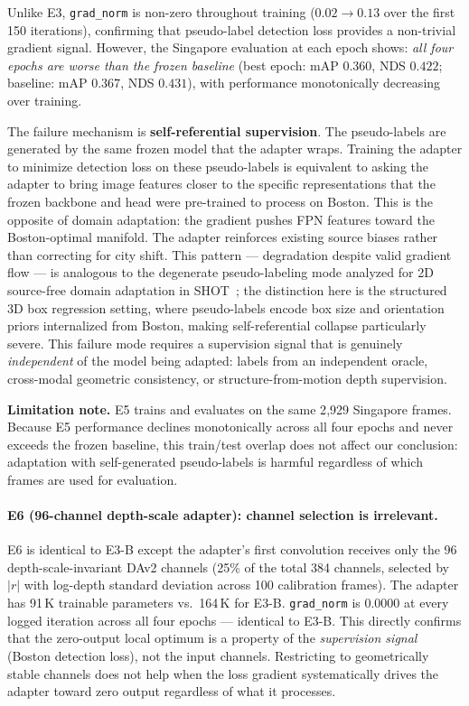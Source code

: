 \documentclass[letterpaper, 10pt, journal]{IEEEtran}
\begin{document}
Unlike E3, \texttt{grad\_norm} is non-zero throughout training ($0.02 \to 0.13$
over the first 150 iterations), confirming that pseudo-label detection loss provides
a non-trivial gradient signal.
However, the Singapore evaluation at each epoch shows:
\emph{all four epochs are worse than the frozen baseline} (best epoch: mAP $0.360$,
NDS $0.422$; baseline: mAP $0.367$, NDS $0.431$), with performance monotonically
decreasing over training.

The failure mechanism is \textbf{self-referential supervision}.
The pseudo-labels are generated by the same frozen model that the adapter wraps.
Training the adapter to minimize detection loss on these pseudo-labels is equivalent
to asking the adapter to bring image features closer to the specific representations
that the frozen backbone and head were pre-trained to process on Boston.
This is the opposite of domain adaptation: the gradient pushes FPN features
toward the Boston-optimal manifold.
The adapter reinforces existing source biases rather than correcting for city shift.
This pattern --- degradation despite valid gradient flow --- is analogous to the
degenerate pseudo-labeling mode analyzed for 2D source-free domain adaptation in
SHOT~\cite{liang2021shot}; the distinction here is the structured 3D box regression
setting, where pseudo-labels encode box size and orientation priors internalized from
Boston, making self-referential collapse particularly severe.
This failure mode requires a supervision signal that is genuinely \emph{independent}
of the model being adapted: labels from an independent oracle, cross-modal geometric
consistency, or structure-from-motion depth supervision.

\noindent\textbf{Limitation note.}
E5 trains and evaluates on the same 2{,}929 Singapore frames.
Because E5 performance declines monotonically across all four epochs and never exceeds
the frozen baseline, this train/test overlap does not affect our conclusion:
adaptation with self-generated pseudo-labels is harmful regardless of which frames
are used for evaluation.

\paragraph{E6 (96-channel depth-scale adapter): channel selection is irrelevant.}
E6 is identical to E3-B except the adapter's first convolution receives only the 96
depth-scale-invariant DAv2 channels (25\% of the total 384 channels, selected by
$|r|$ with log-depth standard deviation across 100 calibration frames).
The adapter has 91\,K trainable parameters vs.\ 164\,K for E3-B.
\texttt{grad\_norm} is $0.0000$ at every logged iteration across all four epochs ---
identical to E3-B.
This directly confirms that the zero-output local optimum is a property of the
\emph{supervision signal} (Boston detection loss), not the input channels.
Restricting to geometrically stable channels does not help when the loss gradient
systematically drives the adapter toward zero output regardless of what it processes.
\end{document}
